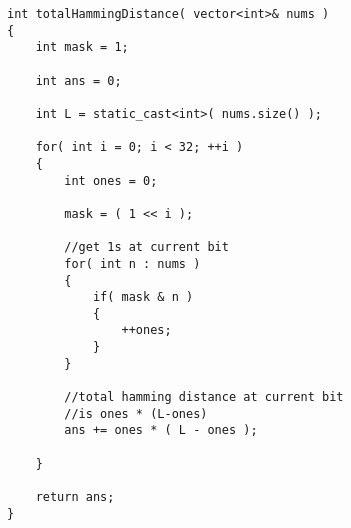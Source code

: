 \setcounter{lstlisting}{0}
\begin{lstlisting}[style=customc, caption={Bit Manipulation}]
int totalHammingDistance( vector<int>& nums )
{
    int mask = 1;

    int ans = 0;

    int L = static_cast<int>( nums.size() );

    for( int i = 0; i < 32; ++i )
    {
        int ones = 0;

        mask = ( 1 << i );

        //get 1s at current bit
        for( int n : nums )
        {
            if( mask & n )
            {
                ++ones;
            }
        }

        //total hamming distance at current bit
        //is ones * (L-ones)
        ans += ones * ( L - ones );

    }
	
    return ans;
}

\end{lstlisting}

